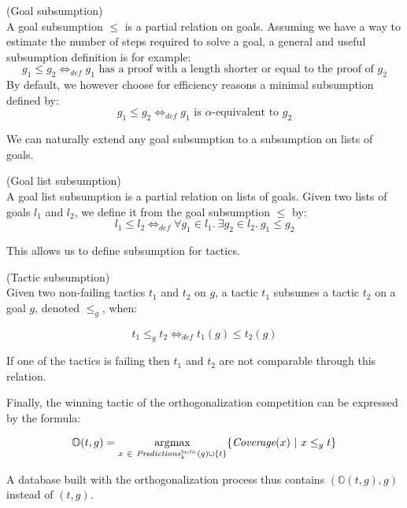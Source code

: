 \documentclass[runningheads,a4paper,draft]{svjour3}
\DeclareMathOperator*{\argmax}{\arg\!\max}
\begin{document}
\begin{definition} (Goal subsumption)\\
A goal subsumption $\le$ is a partial relation on goals.
Assuming we have a way to estimate the number of steps required to solve a goal,
a %
general and useful subsumption definition is for example:
\[g_1 \le g_2  \Leftrightarrow_{def} g_1 \mbox{ has a proof with a length
shorter
or equal to the proof of }
g_2\]
By default, we however choose for efficiency reasons a minimal subsumption defined by:
\[g_1 \le g_2  \Leftrightarrow_{def} g_1 \mbox{ is }\alpha\mbox{-equivalent
to } g_2\]
\end{definition}

We can naturally extend any goal subsumption to a subsumption on
lists of goals.
\begin{definition} (Goal list subsumption)\\
A goal list subsumption is a partial relation on lists of goals.
Given two lists of goals $l_1$ and $l_2$, we define it from the goal
subsumption $\le$ by:
\[l_1 \le l_2  \Leftrightarrow_{def} \forall g_1 \in l_1.\ \exists g_2 \in l_2.\
g_1 \le g_2\]
\end{definition}

This allows us to define subsumption for tactics.
\begin{definition}\label{def:tacsub}(Tactic subsumption)\\
Given two non-failing tactics $t_1$ and $t_2$ on $g$, a tactic $t_1$ subsumes a
tactic $t_2$ on a goal $g$, denoted $\le_g$, when:

 \[t_1 \le_g t_2 \Leftrightarrow_{def} t_1(g) \le t_2(g)\]

If one of the tactics is failing then $t_1$ and $t_2$ are not comparable through
this relation.
\end{definition}

Finally, the winning tactic of the orthogonalization competition can be
expressed by the formula:

\[\mathbb{O}(t,g) = \argmax_{x\ \in\
\mathit{Predictions}^{\mathit{tactic}}_k(g) \cup
\lbrace t
\rbrace} \lbrace
\textit{\mbox{Coverage}}(x)\
|\ x \le_g t\rbrace\]

A database built with the orthogonalization process thus contains
$(\mathbb{O}(t,g),g)$ instead of $(t,g)$.
\end{document}

